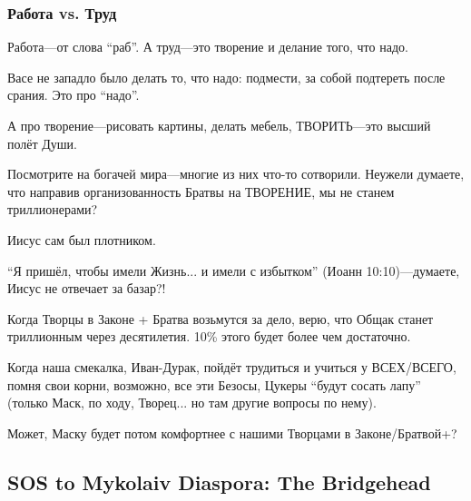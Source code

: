 \documentclass[11pt,a4paper]{article}
\theoremstyle{definition}
\theoremstyle{remark}
\begin{document}
{\subsubsection{Работа vs. Труд}

Работа—от слова ``раб''. А труд—это творение и делание того, что надо.

Васе не западло было делать то, что надо: подмести, за собой подтереть после 
срания. Это про ``надо''.

А про творение—рисовать картины, делать мебель, ТВОРИТЬ—это высший полёт Души.

Посмотрите на богачей мира—многие из них что-то сотворили. Неужели думаете, 
что направив организованность Братвы на ТВОРЕНИЕ, мы не станем триллионерами?

Иисус сам был плотником.

``Я пришёл, чтобы имели Жизнь... и имели с избытком'' (Иоанн 10:10)—думаете, 
Иисус не отвечает за базар?!

Когда Творцы в Законе + Братва возьмутся за дело, верю, что Общак станет 
триллионным через десятилетия. 10\% этого будет более чем достаточно.

Когда наша смекалка, Иван-Дурак, пойдёт трудиться и учиться у ВСЕХ/ВСЕГО, 
помня свои корни, возможно, все эти Безосы, Цукеры ``будут сосать лапу'' 
(только Маск, по ходу, Творец... но там другие вопросы по нему).

Может, Маску будет потом комфортнее с нашими Творцами в Законе/Братвой+?
}


\subsection{SOS to Mykolaiv Diaspora: The Bridgehead}
\end{document}
